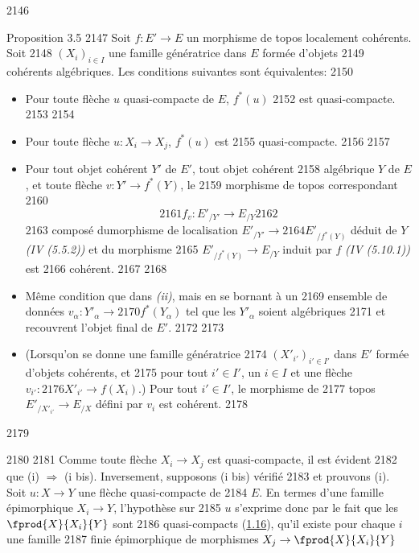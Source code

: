   2146	\begin{enonce*}{Proposition 3.5}
  2147	Soit $f : E'\to E$ un morphisme de topos localement cohérents. Soit
  2148	$(X_i)_{i \in I}$ une famille génératrice dans $E$ formée d'objets
  2149	cohérents algébriques. Les conditions suivantes sont équivalentes:
  2150	\begin{itemize}
  2151	\item[(i)] Pour toute flèche $u$ quasi-compacte de $E$, $f^{\ast}(u)$
  2152	est quasi-compacte.
  2153	
  2154	\item[(i bis)] Pour toute flèche $u : X_i \to X_j$, $f^{\ast}(u)$ est
  2155	  quasi-compacte.
  2156	
  2157	\item[(ii)] Pour tout objet cohérent $Y'$ de $E'$, tout objet cohérent
  2158	  algébrique $Y$ de $E$, et toute flèche $v : Y'\to f^{\ast}(Y)$, le
  2159	  morphisme de topos correspondant
  2160	$$
  2161	f_v : {E'}_{/Y'} \to E_{/Y}
  2162	$$
  2163	composé du\pageoriginale morphisme de localisation ${E'}_{/Y'} \to
  2164	{E'}_{/f^{\ast}(Y)}$ déduit de $Y$ \emph{(IV (5.5.2))} et du morphisme
  2165	${E'}_{/f^{\ast}(Y)} \to E_{/Y}$ induit par $f$ \emph{(IV (5.10.1))} est
  2166	cohérent.
  2167	
  2168	\item[(ii bis)] Même condition que dans \emph{(ii)}, mais en se bornant à un
  2169	  ensemble de données $v_{\alpha} : {Y'}_{\alpha} \to
  2170	  f^{\ast}(Y_{\alpha})$ tel que les ${Y'}_{\alpha}$ soient algébriques
  2171	  et recouvrent l'objet final de $E'$.
  2172	
  2173	\item[(ii ter)] (Lorsqu'on se donne une famille génératrice
  2174	  $(X'_{i'})_{i'\in I'}$ dans $E'$ formée d'objets cohérents, et
  2175	  pour tout $i'\in I'$, un $i \in I$ et une flèche $v_{i'} :
  2176	  X'_{i'} \to f(X_i)$.) Pour tout $i' \in I'$, le morphisme de
  2177	  topos $E'_{/{X'}_{i'}} \to E_{/X}$ défini par $v_i$ est cohérent.
  2178	\end{itemize}
  2179	\end{enonce*}
  2180	
  2181	Comme toute flèche $X_i \to X_j$ est quasi-compacte, il est évident
  2182	que (i) $\Rightarrow$ (i bis). Inversement, supposons (i bis) vérifié
  2183	et prouvons (i). Soit $u : X \to Y$ une flèche quasi-compacte de
  2184	$E$. En termes d'une famille épimorphique $X_i \to Y$, l'hypothèse sur
  2185	$u$ s'exprime donc par le fait que les $\fprod{X}{X_i}{Y}$ sont
  2186	quasi-compacts (\hyperref[VI.cor1.16]{1.16}), \ie qu'il existe pour chaque $i$ une famille
  2187	finie épimorphique de morphismes $X_j \to \fprod{X}{X_i}{Y}$
